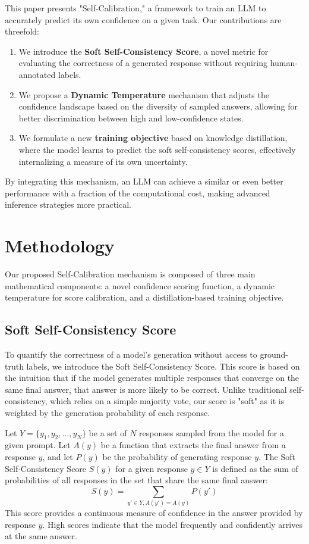 \documentclass{article}
\begin{document}
This paper presents "Self-Calibration," a framework to train an LLM to accurately predict its own confidence on a given task. Our contributions are threefold:
\begin{enumerate}
    \item We introduce the \textbf{Soft Self-Consistency Score}, a novel metric for evaluating the correctness of a generated response without requiring human-annotated labels.
    \item We propose a \textbf{Dynamic Temperature} mechanism that adjusts the confidence landscape based on the diversity of sampled answers, allowing for better discrimination between high and low-confidence states.
    \item We formulate a new \textbf{training objective} based on knowledge distillation, where the model learns to predict the soft self-consistency scores, effectively internalizing a measure of its own uncertainty.
\end{enumerate}
By integrating this mechanism, an LLM can achieve a similar or even better performance with a fraction of the computational cost, making advanced inference strategies more practical.

\section{Methodology}
Our proposed Self-Calibration mechanism is composed of three main mathematical components: a novel confidence scoring function, a dynamic temperature for score calibration, and a distillation-based training objective.

\subsection{Soft Self-Consistency Score}
To quantify the correctness of a model's generation without access to ground-truth labels, we introduce the Soft Self-Consistency Score. This score is based on the intuition that if the model generates multiple responses that converge on the same final answer, that answer is more likely to be correct. Unlike traditional self-consistency, which relies on a simple majority vote, our score is "soft" as it is weighted by the generation probability of each response.

Let $Y = \{y_1, y_2, \dots, y_N\}$ be a set of $N$ responses sampled from the model for a given prompt. Let $A(y)$ be a function that extracts the final answer from a response $y$, and let $P(y)$ be the probability of generating response $y$. The Soft Self-Consistency Score $S(y)$ for a given response $y \in Y$ is defined as the sum of probabilities of all responses in the set that share the same final answer:
\begin{equation}
S(y) = \sum_{y' \in Y, A(y')=A(y)} P(y')
\end{equation}
This score provides a continuous measure of confidence in the answer provided by response $y$. High scores indicate that the model frequently and confidently arrives at the same answer.
\end{document}

